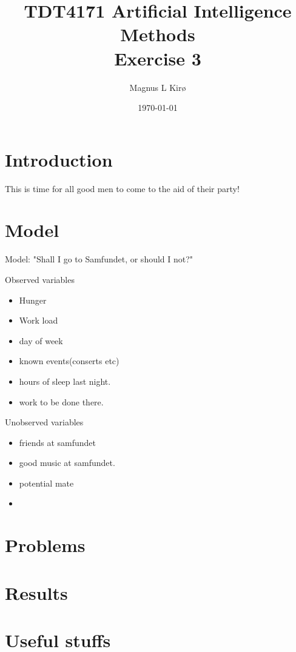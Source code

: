 \documentclass[12pt, a4paper]{article}
\title{TDT4171 Artificial Intelligence Methods \\ Exercise 3}
\author{
        Magnus L Kirø \\
}
\date{\today}
\begin{document}
\maketitle
{}

\section{Introduction}
This is time for all good men to come to the aid of their party!

\section{Model}

Model: "Shall I go to Samfundet, or should I not?"

Observed variables
\begin{itemize}
	\item Hunger
	\item Work load
	\item day of week
	\item known events(conserts etc)
	\item hours of sleep last night. 
	\item work to be done there. 

\end{itemize}

Unobserved variables
\begin{itemize}
	\item friends at samfundet
	\item good music at samfundet.
	\item potential mate
	\item 

\end{itemize}


\section{Problems}

\section{Results}



\section{Useful stuffs}
\end{document}
